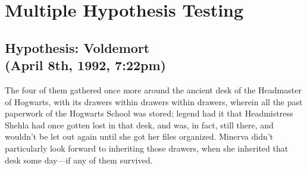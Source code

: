 \chapter{Multiple Hypothesis Testing}

\begin{headlines}


\label{Toronto Magical Tribune:}




\label{New Zealand Spellcrafter's Diurnal Notice:}



\label{American Mage:}


\label{The Quibbler:}


\label{Daily Prophet:}

\end{headlines}
\later
\section{Hypothesis: Voldemort\\
(April 8th, 1992, 7:22pm)}

The four of them gathered once more around the ancient desk of the Headmaster
of Hogwarts, with its drawers within drawers within drawers, wherein all the
past paperwork of the Hogwarts School was stored; legend had it that
Headmistress Shehla had once gotten lost in that desk, and was, in fact, still
there, and wouldn't be let out again until she got her files organized. Minerva
didn't particularly look forward to inheriting those drawers, when she
inherited that desk some day---if any of them survived.

